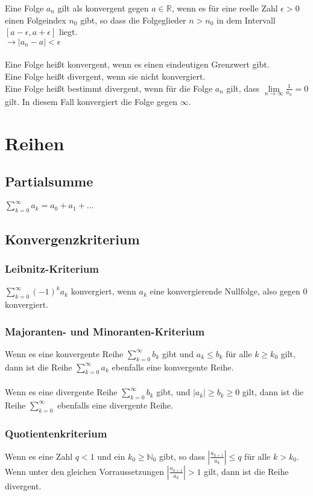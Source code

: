 \documentclass[a4paper,landscape, 11pt]{article}
\newcommand{\limFromTo}[2]{ \lim\limits_{#2 \rightarrow #1}}
\begin{document}
\begin{multicols}{4}
\begin{small}
            Eine Folge $a_n$ gilt als konvergent gegen $a \in \mathbb{R}$, wenn es für eine reelle Zahl $\epsilon > 0$ einen Folgeindex $n_0$ gibt, so dass die Folgeglieder $n>n_0$ in dem Intervall $\left[ a - \epsilon, a + \epsilon \right] $ liegt.\\
            $\rightarrow | a_n - a | < \epsilon$
            \\ \\
            Eine Folge heißt konvergent, wenn es einen eindeutigen Grenzwert gibt. \\
            Eine Folge heißt divergent, wenn sie nicht konvergiert. \\
            Eine Folge heißt bestimmt divergent, wenn für die Folge $a_n$ gilt, dass $\limFromTo{\infty}{n}\frac{1}{a_n} = 0$ gilt. In diesem Fall konvergiert die Folge gegen $\infty$.
    \section{Reihen}
        \subsection{Partialsumme}
            $\sum_{k=0}^{\infty} a_k = a_0 + a_1 + ... $
        \subsection{Konvergenzkriterium}
            \subsubsection{Leibnitz-Kriterium}
                $\sum_{k=0}^{\infty} (-1)^k a_k$ konvergiert, wenn $a_k$ eine konvergierende Nullfolge, also gegen 0 konvergiert.        
            \subsubsection{Majoranten- und Minoranten-Kriterium}
                Wenn es eine konvergente Reihe $\sum_{k=0}^{\infty}b_k$ gibt und $a_k \le b_k$ für alle $k \ge k_0$ gilt, dann ist die Reihe $\sum_{k=0}^{\infty}a_k$ ebenfalls eine konvergente Reihe.
                \\ \\
                Wenn es eine divergente Reihe $\sum_{k=0}^{\infty}b_k$ gibt,  und $|a_k| \ge b_k \ge 0$ gilt, dann ist die Reihe $\sum_{k=0}^{\infty}$ ebenfalls eine divergente Reihe.
            \subsubsection{Quotientenkriterium}
                Wenn es eine Zahl $q < 1$ und ein $k_0 \ge \mathbb{N}_0$ gibt, so dass $\left|\frac{a_{k+1}}{a_k} \right| \le q$ für alle $k > k_0.$ \\
                Wenn unter den gleichen Vorraussetzungen $\left|\frac{a_{k+1}}{a_k} \right| > 1$ gilt, dann ist die Reihe divergent.

\end{small}
\end{multicols}
\end{document}
